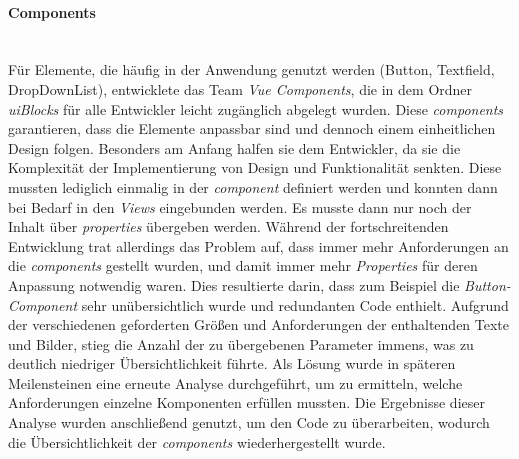 \documentclass[10pt, a4paper]{article}
\begin{document}
\begin{onehalfspace}
\paragraph*{Components}$~$ \\
Für Elemente, die häufig in der Anwendung genutzt werden (Button, Textfield, DropDownList),
entwicklete das Team \textit{Vue Components}, die in dem Ordner \textit{uiBlocks} für alle Entwickler leicht zugänglich abgelegt wurden.
Diese \textit{components} garantieren, dass die Elemente anpassbar sind und dennoch einem einheitlichen Design folgen.
Besonders am Anfang halfen sie dem Entwickler, da sie die Komplexität der Implementierung von Design und Funktionalität senkten.
Diese mussten lediglich einmalig in der \textit{component} definiert werden und konnten dann bei Bedarf in den \textit{Views} eingebunden werden.
Es musste dann nur noch der Inhalt über \textit{properties} übergeben werden.
Während der fortschreitenden Entwicklung trat allerdings das Problem auf, dass immer mehr Anforderungen an die \textit{components} gestellt wurden,
 und damit immer mehr \textit{Properties} für deren Anpassung notwendig waren.
 Dies resultierte darin, dass zum Beispiel die \textit{Button-Component} sehr unübersichtlich wurde und redundanten Code enthielt.
Aufgrund der verschiedenen geforderten Größen und Anforderungen der enthaltenden Texte und Bilder,
 stieg die Anzahl der zu übergebenen Parameter immens, was zu deutlich niedriger Übersichtlichkeit führte.
Als Lösung wurde in späteren Meilensteinen eine erneute Analyse durchgeführt, um zu ermitteln, welche Anforderungen einzelne Komponenten erfüllen mussten.
Die Ergebnisse dieser Analyse wurden anschließend genutzt, um den Code zu überarbeiten, wodurch die Übersichtlichkeit der \textit{components} wiederhergestellt wurde.


\end{onehalfspace}
\end{document}
